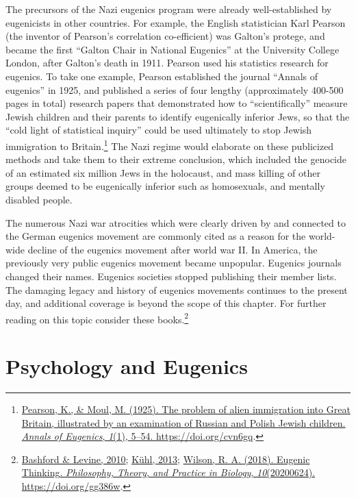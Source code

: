 \documentclass[
  oneside,
  12pt]{crumpbook}
\begin{document}
The precursors of the Nazi eugenics program were already well-established by eugenicists in other countries. For example, the English statistician Karl Pearson (the inventor of Pearson's correlation co-efficient) was Galton's protege, and became the first ``Galton Chair in National Eugenics'' at the University College London, after Galton's death in 1911. Pearson used his statistics research for eugenics. To take one example, Pearson established the journal ``Annals of eugenics'' in 1925, and published a series of four lengthy (approximately 400-500 pages in total) research papers that demonstrated how to ``scientifically'' measure Jewish children and their parents to identify eugenically inferior Jews, so that the ``cold light of statistical inquiry'' could be used ultimately to stop Jewish immigration to Britain.\footnote{\protect\hyperlink{ref-pearsonProblemAlienImmigration1925}{Pearson, K., \& Moul, M. (1925). The problem of alien immigration into {Great Britain}, illustrated by an examination of {Russian} and {Polish Jewish} children. \emph{Annals of Eugenics}, \emph{1}(1), 5--54. \url{https://doi.org/cvn6gq}}.} The Nazi regime would elaborate on these publicized methods and take them to their extreme conclusion, which included the genocide of an estimated six million Jews in the holocaust, and mass killing of other groups deemed to be eugenically inferior such as homosexuals, and mentally disabled people.

The numerous Nazi war atrocities which were clearly driven by and connected to the German eugenics movement are commonly cited as a reason for the world-wide decline of the eugenics movement after world war II. In America, the previously very public eugenics movement became unpopular. Eugenics journals changed their names. Eugenics societies stopped publishing their member lists. The damaging legacy and history of eugenics movements continues to the present day, and additional coverage is beyond the scope of this chapter. For further reading on this topic consider these books.\footnote{\protect\hyperlink{ref-bashfordOxfordHandbookHistory2010}{Bashford \& Levine, 2010}; \protect\hyperlink{ref-kuhlBettermentRaceRise2013}{Kühl, 2013}; \protect\hyperlink{ref-wilsonEugenicThinking2018}{Wilson, R. A. (2018). Eugenic {Thinking}. \emph{Philosophy, Theory, and Practice in Biology}, \emph{10}(20200624). \url{https://doi.org/gg386w}}.}

\hypertarget{psychology-and-eugenics}{%
\section{Psychology and Eugenics}\label{psychology-and-eugenics}}
\end{document}
